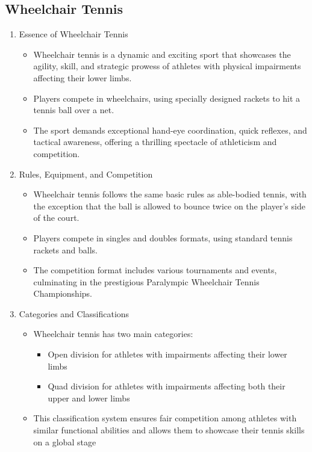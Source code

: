 \subsection{Wheelchair Tennis}

\begin{enumerate}

\item Essence of Wheelchair Tennis
    \begin{itemize}
    \item Wheelchair tennis is a dynamic and exciting sport that showcases the agility, skill, and strategic prowess of athletes with physical impairments affecting their lower limbs. 
    \item Players compete in wheelchairs, using specially designed rackets to hit a tennis ball over a net. 
    \item The sport demands exceptional hand-eye coordination, quick reflexes, and tactical awareness, offering a thrilling spectacle of athleticism and competition.
    \end{itemize}

\item Rules, Equipment, and Competition
    \begin{itemize}
    \item Wheelchair tennis follows the same basic rules as able-bodied tennis, with the exception that the ball is allowed to bounce twice on the player's side of the court. 
    \item Players compete in singles and doubles formats, using standard tennis rackets and balls. 
    \item The competition format includes various tournaments and events, culminating in the prestigious Paralympic Wheelchair Tennis Championships. 
    \end{itemize}

\item Categories and Classifications
    \begin{itemize}
    \item Wheelchair tennis has two main categories: 
        \begin{itemize}
        \item Open division for athletes with impairments affecting their lower limbs
        \item Quad division for athletes with impairments affecting both their upper and lower limbs
        \end{itemize}
    \item This classification system ensures fair competition among athletes with similar functional abilities and allows them to showcase their tennis skills on a global stage
    \end{itemize}

\end{enumerate}